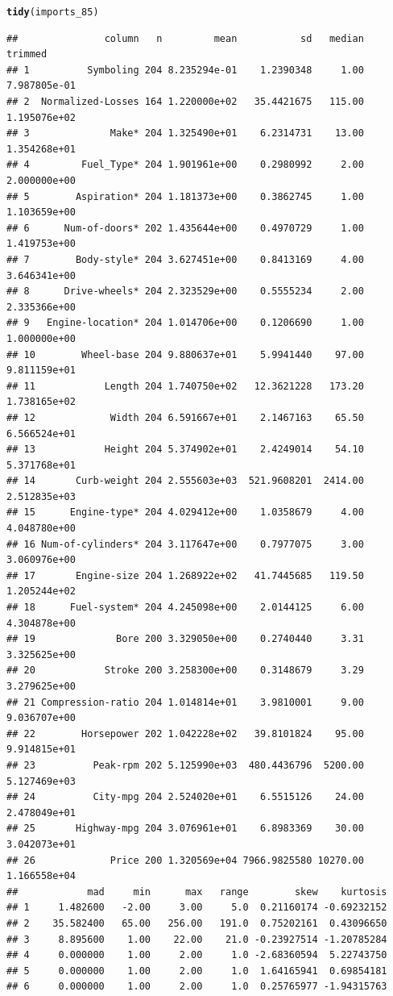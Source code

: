 \documentclass{article}\usepackage[]{graphicx}\usepackage[]{color}
\makeatletter
\newcommand{\hlstd}[1]{\textcolor[rgb]{0.345,0.345,0.345}{#1}}%
\newcommand{\hlkwd}[1]{\textcolor[rgb]{0.737,0.353,0.396}{\textbf{#1}}}%
\newenvironment{kframe}{%
 \def\at@end@of@kframe{}%
 \ifinner\ifhmode%
  \def\at@end@of@kframe{\end{minipage}}%
  \begin{minipage}{\columnwidth}%
 \fi\fi%
 \def\FrameCommand##1{\hskip\@totalleftmargin \hskip-\fboxsep
 \colorbox{shadecolor}{##1}\hskip-\fboxsep
     \hskip-\linewidth \hskip-\@totalleftmargin \hskip\columnwidth}%
 \MakeFramed {\advance\hsize-\width
   \@totalleftmargin\z@ \linewidth\hsize
   \@setminipage}}%
 {\par\unskip\endMakeFramed%
 \at@end@of@kframe}
\newenvironment{knitrout}{}{} %
\makeatother
\begin{document}
\begin{knitrout}
\begin{kframe}
\begin{alltt}
\hlkwd{tidy}\hlstd{(imports_85)}
\end{alltt}
\begin{verbatim}
##               column   n         mean           sd   median      trimmed
## 1          Symboling 204 8.235294e-01    1.2390348     1.00 7.987805e-01
## 2  Normalized-Losses 164 1.220000e+02   35.4421675   115.00 1.195076e+02
## 3              Make* 204 1.325490e+01    6.2314731    13.00 1.354268e+01
## 4         Fuel_Type* 204 1.901961e+00    0.2980992     2.00 2.000000e+00
## 5        Aspiration* 204 1.181373e+00    0.3862745     1.00 1.103659e+00
## 6      Num-of-doors* 202 1.435644e+00    0.4970729     1.00 1.419753e+00
## 7        Body-style* 204 3.627451e+00    0.8413169     4.00 3.646341e+00
## 8      Drive-wheels* 204 2.323529e+00    0.5555234     2.00 2.335366e+00
## 9   Engine-location* 204 1.014706e+00    0.1206690     1.00 1.000000e+00
## 10        Wheel-base 204 9.880637e+01    5.9941440    97.00 9.811159e+01
## 11            Length 204 1.740750e+02   12.3621228   173.20 1.738165e+02
## 12             Width 204 6.591667e+01    2.1467163    65.50 6.566524e+01
## 13            Height 204 5.374902e+01    2.4249014    54.10 5.371768e+01
## 14       Curb-weight 204 2.555603e+03  521.9608201  2414.00 2.512835e+03
## 15      Engine-type* 204 4.029412e+00    1.0358679     4.00 4.048780e+00
## 16 Num-of-cylinders* 204 3.117647e+00    0.7977075     3.00 3.060976e+00
## 17       Engine-size 204 1.268922e+02   41.7445685   119.50 1.205244e+02
## 18      Fuel-system* 204 4.245098e+00    2.0144125     6.00 4.304878e+00
## 19              Bore 200 3.329050e+00    0.2740440     3.31 3.325625e+00
## 20            Stroke 200 3.258300e+00    0.3148679     3.29 3.279625e+00
## 21 Compression-ratio 204 1.014814e+01    3.9810001     9.00 9.036707e+00
## 22        Horsepower 202 1.042228e+02   39.8101824    95.00 9.914815e+01
## 23          Peak-rpm 202 5.125990e+03  480.4436796  5200.00 5.127469e+03
## 24          City-mpg 204 2.524020e+01    6.5515126    24.00 2.478049e+01
## 25       Highway-mpg 204 3.076961e+01    6.8983369    30.00 3.042073e+01
## 26             Price 200 1.320569e+04 7966.9825580 10270.00 1.166558e+04
##            mad     min      max   range        skew    kurtosis
## 1     1.482600   -2.00     3.00     5.0  0.21160174 -0.69232152
## 2    35.582400   65.00   256.00   191.0  0.75202161  0.43096650
## 3     8.895600    1.00    22.00    21.0 -0.23927514 -1.20785284
## 4     0.000000    1.00     2.00     1.0 -2.68360594  5.22743750
## 5     0.000000    1.00     2.00     1.0  1.64165941  0.69854181
## 6     0.000000    1.00     2.00     1.0  0.25765977 -1.94315763

\end{verbatim}
\end{kframe}
\end{knitrout}
\end{document}
